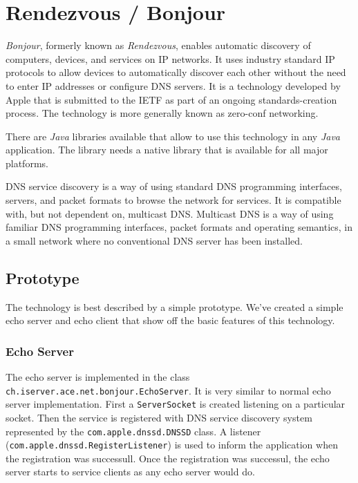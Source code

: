 \section{Rendezvous / Bonjour}
\label{sect:bonjour}

\emph{Bonjour}, formerly known as \emph{Rendezvous}, enables automatic discovery of computers, devices, and services on IP networks. It uses industry standard IP protocols to allow devices to automatically discover each other without the need to enter IP addresses or configure DNS servers. It is a technology developed by Apple that is submitted to the IETF as part of an ongoing standards-creation process. The technology is more generally known as zero-conf networking.

There are \emph{Java} libraries available that allow to use this technology in any \emph{Java} application. The library needs a native library that is available for all major platforms. 

DNS service discovery is a way of using standard DNS programming interfaces, servers, and packet formats to browse the network for services. It is compatible with, but not dependent on, multicast DNS. Multicast DNS is a way of using familiar DNS programming interfaces, packet formats and operating semantics, in a small network where no conventional DNS server has been installed.



\subsection{Prototype}
The technology is best described by a simple prototype. We've created a simple echo server and echo client that show off the basic features of this technology.

\subsubsection{Echo Server}
The echo server is implemented in the class \texttt{ch.iserver.ace.net.bonjour.EchoServer}. It is very similar to normal echo server implementation. First a \texttt{ServerSocket} is created listening on a particular socket. Then the service is registered with DNS service discovery system represented by the \texttt{com.apple.dnssd.DNSSD} class. A listener (\texttt{com.apple.dnssd.RegisterListener}) is used to inform the application when the registration was successull. Once the registration was successul, the echo server starts to service clients as any echo server would do.

